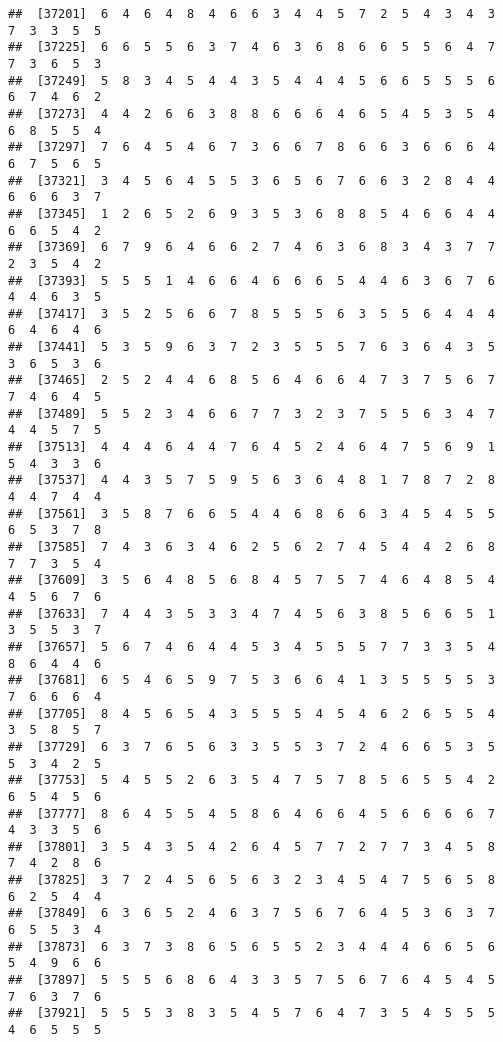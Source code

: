 \documentclass[
]{book}
\begin{document}
\begin{verbatim}
##  [37201]  6  4  6  4  8  4  6  6  3  4  4  5  7  2  5  4  3  4  3  7  3  3  5  5
##  [37225]  6  6  5  5  6  3  7  4  6  3  6  8  6  6  5  5  6  4  7  7  3  6  5  3
##  [37249]  5  8  3  4  5  4  4  3  5  4  4  4  5  6  6  5  5  5  6  6  7  4  6  2
##  [37273]  4  4  2  6  6  3  8  8  6  6  6  4  6  5  4  5  3  5  4  6  8  5  5  4
##  [37297]  7  6  4  5  4  6  7  3  6  6  7  8  6  6  3  6  6  6  4  6  7  5  6  5
##  [37321]  3  4  5  6  4  5  5  3  6  5  6  7  6  6  3  2  8  4  4  6  6  6  3  7
##  [37345]  1  2  6  5  2  6  9  3  5  3  6  8  8  5  4  6  6  4  4  6  6  5  4  2
##  [37369]  6  7  9  6  4  6  6  2  7  4  6  3  6  8  3  4  3  7  7  2  3  5  4  2
##  [37393]  5  5  5  1  4  6  6  4  6  6  6  5  4  4  6  3  6  7  6  4  4  6  3  5
##  [37417]  3  5  2  5  6  6  7  8  5  5  5  6  3  5  5  6  4  4  4  6  4  6  4  6
##  [37441]  5  3  5  9  6  3  7  2  3  5  5  5  7  6  3  6  4  3  5  3  6  5  3  6
##  [37465]  2  5  2  4  4  6  8  5  6  4  6  6  4  7  3  7  5  6  7  7  4  6  4  5
##  [37489]  5  5  2  3  4  6  6  7  7  3  2  3  7  5  5  6  3  4  7  4  4  5  7  5
##  [37513]  4  4  4  6  4  4  7  6  4  5  2  4  6  4  7  5  6  9  1  5  4  3  3  6
##  [37537]  4  4  3  5  7  5  9  5  6  3  6  4  8  1  7  8  7  2  8  4  4  7  4  4
##  [37561]  3  5  8  7  6  6  5  4  4  6  8  6  6  3  4  5  4  5  5  6  5  3  7  8
##  [37585]  7  4  3  6  3  4  6  2  5  6  2  7  4  5  4  4  2  6  8  7  7  3  5  4
##  [37609]  3  5  6  4  8  5  6  8  4  5  7  5  7  4  6  4  8  5  4  4  5  6  7  6
##  [37633]  7  4  4  3  5  3  3  4  7  4  5  6  3  8  5  6  6  5  1  3  5  5  3  7
##  [37657]  5  6  7  4  6  4  4  5  3  4  5  5  5  7  7  3  3  5  4  8  6  4  4  6
##  [37681]  6  5  4  6  5  9  7  5  3  6  6  4  1  3  5  5  5  5  3  7  6  6  6  4
##  [37705]  8  4  5  6  5  4  3  5  5  5  4  5  4  6  2  6  5  5  4  3  5  8  5  7
##  [37729]  6  3  7  6  5  6  3  3  5  5  3  7  2  4  6  6  5  3  5  5  3  4  2  5
##  [37753]  5  4  5  5  2  6  3  5  4  7  5  7  8  5  6  5  5  4  2  6  5  4  5  6
##  [37777]  8  6  4  5  5  4  5  8  6  4  6  6  4  5  6  6  6  6  7  4  3  3  5  6
##  [37801]  3  5  4  3  5  4  2  6  4  5  7  7  2  7  7  3  4  5  8  7  4  2  8  6
##  [37825]  3  7  2  4  5  6  5  6  3  2  3  4  5  4  7  5  6  5  8  6  2  5  4  4
##  [37849]  6  3  6  5  2  4  6  3  7  5  6  7  6  4  5  3  6  3  7  6  5  5  3  4
##  [37873]  6  3  7  3  8  6  5  6  5  5  2  3  4  4  4  6  6  5  6  5  4  9  6  6
##  [37897]  5  5  5  6  8  6  4  3  3  5  7  5  6  7  6  4  5  4  5  7  6  3  7  6
##  [37921]  5  5  5  3  8  3  5  4  5  7  6  4  7  3  5  4  5  5  5  4  6  5  5  5

\end{verbatim}
\end{document}

